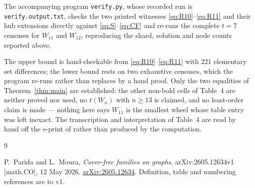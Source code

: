 \documentclass[11pt]{amsart}
\begin{document}
The accompanying program \texttt{verify.py}, whose recorded run is
\texttt{verify.output.txt}, checks the two printed witnesses
\eqref{eq:R10}--\eqref{eq:R11} and their hub extensions directly against
\eqref{eq:S}--\eqref{eq:CF} and re-runs the complete $t=7$ censuses for
$W_{11}$ and $W_{12}$, reproducing the shard, solution and node counts reported
above.

The upper bound is hand-checkable from \eqref{eq:R10}--\eqref{eq:R11} with $221$
elementary set differences; the lower bound rests on two exhaustive censuses,
which the program re-runs rather than replaces by a hand proof. Only the two
equalities of Theorem~\ref{thm:main} are established: the other non-bold cells
of Table~4 are neither proved nor used, no
$t(W_n)$ with $n\ge13$ is claimed, and no least-order claim is made --- nothing
here says $W_{11}$ is the smallest wheel whose table entry was left inexact.
The transcription and
interpretation of Table~4 are read by hand off the e-print of \cite{PM} rather
than produced by the computation.

\begin{thebibliography}{9}

P.~Parida and L.~Moura,
\emph{Cover-free families on graphs},
arXiv:2605.12634v1 [math.CO], 12 May 2026.
\href{https://arxiv.org/abs/2605.12634}{arXiv:2605.12634}.
Definition, table and numbering references are to v1.

\end{thebibliography}
\end{document}
